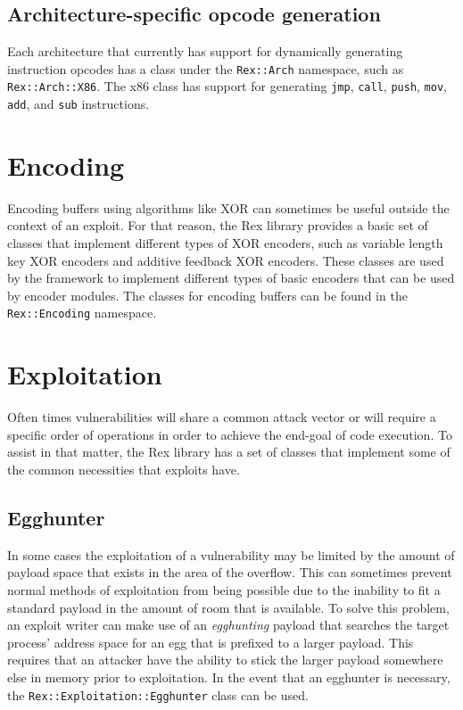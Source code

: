 \documentclass{report}
\begin{document}
        \subsection{Architecture-specific opcode generation}

\par
Each architecture that currently has support for dynamically
generating instruction opcodes has a class under the
\texttt{Rex::Arch} namespace, such as \texttt{Rex::Arch::X86}.  The
x86 class has support for generating \texttt{jmp}, \texttt{call},
\texttt{push}, \texttt{mov}, \texttt{add}, and \texttt{sub}
instructions.

    \section{Encoding}

\par
Encoding buffers using algorithms like XOR can sometimes be useful
outside the context of an exploit.  For that reason, the Rex library
provides a basic set of classes that implement different types of
XOR encoders, such as variable length key XOR encoders and additive
feedback XOR encoders.  These classes are used by the framework to
implement different types of basic encoders that can be used by
encoder modules.  The classes for encoding buffers can be found in
the \texttt{Rex::Encoding} namespace.

    \section{Exploitation}

\par
Often times vulnerabilities will share a common attack vector or
will require a specific order of operations in order to achieve the
end-goal of code execution.  To assist in that matter, the Rex
library has a set of classes that implement some of the common
necessities that exploits have.

        \subsection{Egghunter}

\par
In some cases the exploitation of a vulnerability may be limited by
the amount of payload space that exists in the area of the overflow.
This can sometimes prevent normal methods of exploitation from being
possible due to the inability to fit a standard payload in the
amount of room that is available.  To solve this problem, an exploit
writer can make use of an \textit{egghunting} payload that searches
the target process' address space for an egg that is prefixed to a
larger payload.  This requires that an attacker have the ability to
stick the larger payload somewhere else in memory prior to
exploitation.  In the event that an egghunter is necessary, the
\texttt{Rex::Exploitation::Egghunter} class can be used.
\end{document}
